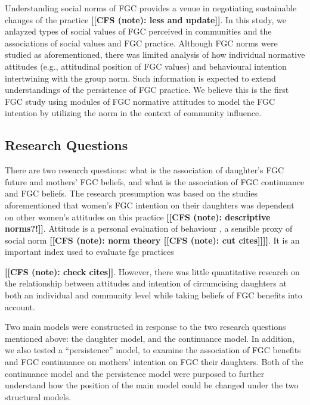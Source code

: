 \documentclass[12pt,]{article}
\newcommand{\comment}[1]{\textbf{[[#1]]}}
\newcommand{\cfonly}[1]{\comment{CFS (note): #1}}
\begin{document}
{Understanding social norms of FGC provides a venue in negotiating sustainable changes of the practice \cite{Bicc10, BiccMari15, BoylCorl010, DuncWand11, Drol11, EffeVogt15, Hayf05, HayfTrin11, Grue05, Hodg11,KandNwak09, Mack96, Mack00, MackLeJe08, OdukAfol17, RimaLapi15, Youn02, Youn11, UNIC10, UNIC13} \cfonly{less and update}.  In this study, we anlayzed types of social values of FGC perceived in communities and the associations of social values and FGC practice.  Although FGC norms were studied as aforementioned, there was limited analysis of how individual normative attitudes (e.g., attitudinal position of FGC values) and behavioural intention intertwining with the group norm.  Such information is expected to extend understandings of the persistence of FGC practice.  We believe this is the first FGC study using modules of FGC normative attitudes to model the FGC intention by utilizing the norm in the context of community influence.

\subsection{Research Questions}\label{research-questions}

There are two research questions:  what is the association of daughter's FGC future and mothers' FGC beliefs, and what is the association of FGC continuance and FGC beliefs. The research presumption was based on the studies aforementioned that women’s FGC intention on their daughters was dependent on other women’s attitudes on this practice \cfonly{descriptive norms?!}.  Attitude is a personal evaluation of behaviour \cite{Ajze91}, a sensible proxy of social norm \cfonly {norm theory \cite{Ajze91, Ajze02, Bicc10, BiccMari15, Mack96, Mack00, MackLeJe08, RimaLapi15, Youn11}\cfonly{cut cites}}.  It is an important index used to evaluate fgc practices \cite{CislHeis18, EffeVogt15, Harf06, ModrLiu13, PashPonn16, ShelHern06,}} \cfonly{check cites}.  However, there was little quantitative research on the relationship between attitudes and intention of circumcising daughters at both an individual and community level while taking beliefs of FGC benefits into account.

Two main models were constructed in response to the two research questions mentioned above:  the daughter model, and the continuance model.  In addition, we also tested a “persistence” model, to examine the association of FGC benefits and FGC continuance on mothers' intention on FGC their  daughters.  Both of the continuance model and the persistence model were purposed to further understand how the position of the main model could be changed under the two structural models.
\end{document}
